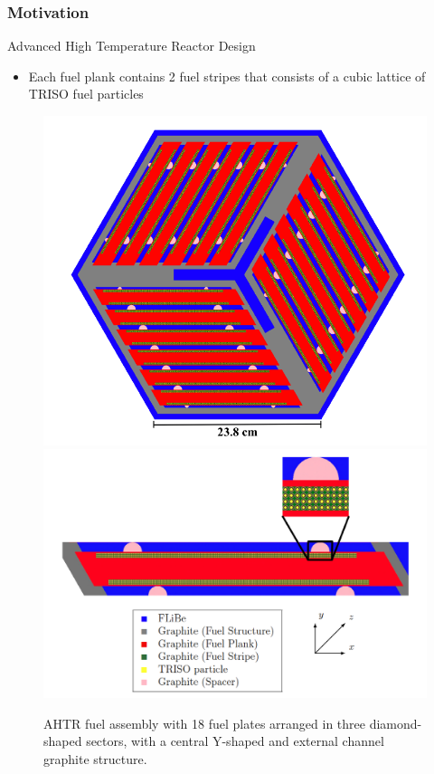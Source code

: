 \begin{frame}
  \frametitle{Motivation}
  \begin{block}{Advanced High Temperature Reactor Design}
    \begin{itemize}
      \item Each fuel plank contains 2 fuel stripes that consists of a cubic 
      lattice of TRISO fuel particles
    \end{itemize}
  \end{block}
  \vspace{-0.3cm}
  \begin{figure}[]
    \includegraphics[width=0.5\linewidth]{figures/ahtr-assembly.png} 
    \includegraphics[width=0.5\linewidth]{figures/ahtr-plank.png} 
    \caption{\acrfull{AHTR} fuel assembly with 18 fuel plates arranged in 
    three diamond-shaped sectors, with a central Y-shaped and external channel 
    graphite structure.}
\end{figure}
\end{frame}

